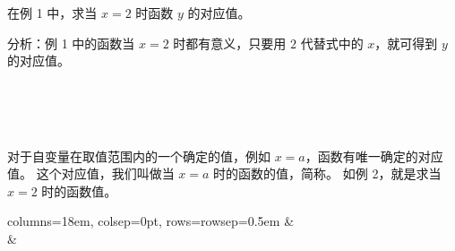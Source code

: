 \liti 在例 1 中，求当 $x = 2$ 时函数 $y$ 的对应值。

分析：例 1 中的函数当 $x = 2$ 时都有意义，只要用 $2$ 代替式中的 $x$，就可得到 $y$ 的对应值。

\begin{xiaoxiaotis}

\jie \begin{tblr}[t]{}
     \\
     \\
     \\
\end{tblr}

\end{xiaoxiaotis}

对于自变量在取值范围内的一个确定的值，例如 $x = a$，函数有唯一确定的对应值。
这个对应值，我们叫做当 $x = a$ 时的函数的值，简称。
如例 2，就是求当 $x = 2$ 时的函数值。


\lianxi
\begin{xiaotis}
\begin{enhancedline}

\begin{xiaoxiaotis}




\end{xiaoxiaotis}

\begin{xiaoxiaotis}

    \begin{tblr}{columns={18em, colsep=0pt}, rows={rowsep=0.5em}}
          &  \\
             & 
    \end{tblr}
\end{xiaoxiaotis}
\end{enhancedline}



\end{xiaotis}

